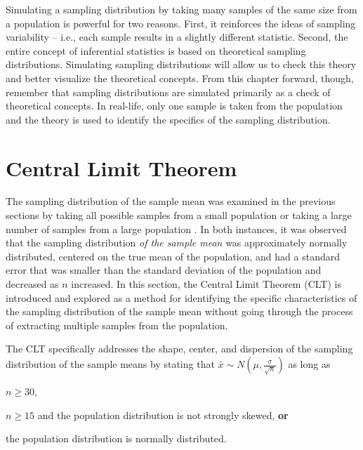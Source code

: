 \documentclass[10pt,openany]{book}\usepackage[]{graphicx}\usepackage[]{color}
\begin{document}
Simulating a sampling distribution by taking many samples of the same size from a population is powerful for two reasons.  First, it reinforces the ideas of sampling variability -- i.e., each sample results in a slightly different statistic.  Second, the entire concept of inferential statistics is based on theoretical sampling distributions.  Simulating sampling distributions will allow us to check this theory and better visualize the theoretical concepts.  From this chapter forward, though, remember that sampling distributions are simulated primarily as a check of theoretical concepts.  In real-life, only one sample is taken from the population and the theory is used to identify the specifics of the sampling distribution.



\section{Central Limit Theorem} \label{sect:CLT}
\vspace{-12pt}
The sampling distribution of the sample mean was examined in the previous sections by taking all possible samples from a small population  or taking a large number of samples from a large population .  In both instances, it was observed that the sampling distribution \textit{of the sample mean} was approximately normally distributed, centered on the true mean of the population, and had a standard error that was smaller than the standard deviation of the population and decreased as $n$ increased.  In this section, the Central Limit Theorem (CLT) is introduced and explored as a method for identifying the specific characteristics of the sampling distribution of the sample mean without going through the process of extracting multiple samples from the population.

The CLT specifically addresses the shape, center, and dispersion of the sampling distribution of the sample means by stating that $\bar{x}\sim N\left(\mu,\frac{\sigma}{\sqrt{n}}\right)$ as long as

\begin{Itemize}
  \item $n\geq30$,
  \item $n\geq15$ and the population distribution is not strongly skewed, \textbf{or}
  \item the population distribution is normally distributed.
\end{Itemize}
\end{document}
